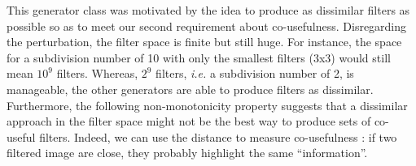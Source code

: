 \documentclass[a4paper]{report}
\begin{document}
			\par
			This generator class was motivated by the idea to produce as dissimilar filters as possible so as to meet our second requirement about co-usefulness. Disregarding the perturbation, the filter space is finite but still huge. For instance, the space for a subdivision number of 10 with only the smallest filters (3x3) would still mean $10^9$ filters.  Whereas, $2^9$ filters, \textit{i.e.} a subdivision number of 2, is manageable, the other generators are able to produce filters as dissimilar. Furthermore, the following non-monotonicity property suggests that a dissimilar approach in the filter space might not be the best way to produce sets of co-useful filters. Indeed, we can use the distance to measure co-usefulness : if two filtered image are close, they probably highlight the same ``information''.
			
\end{document}
